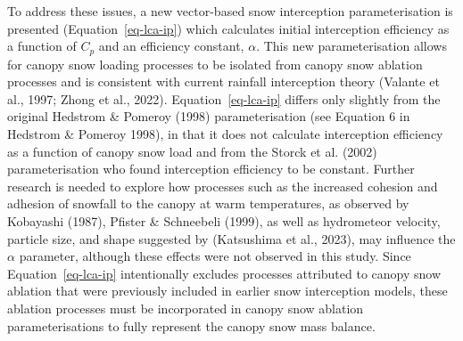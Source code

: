 \documentclass[
  letterpaper,
  DIV=11,
  numbers=noendperiod]{scrartcl}
\begin{document}
To address these issues, a new vector-based snow interception
parameterisation is presented (Equation~\ref{eq-lca-ip}) which
calculates initial interception efficiency as a function of \(C_p\) and
an efficiency constant, \(\alpha\). This new parameterisation allows for
canopy snow loading processes to be isolated from canopy snow ablation
processes and is consistent with current rainfall interception theory
(Valante et al., 1997; Zhong et al., 2022). Equation~\ref{eq-lca-ip}
differs only slightly from the original Hedstrom \& Pomeroy (1998)
parameterisation (see Equation 6 in Hedstrom \& Pomeroy 1998), in that
it does not calculate interception efficiency as a function of canopy
snow load and from the Storck et al. (2002) parameterisation who found
interception efficiency to be constant. Further research is needed to
explore how processes such as the increased cohesion and adhesion of
snowfall to the canopy at warm temperatures, as observed by Kobayashi
(1987), Pfister \& Schneebeli (1999), as well as hydrometeor velocity,
particle size, and shape suggested by (Katsushima et al., 2023), may
influence the \(\alpha\) parameter, although these effects were not
observed in this study. Since Equation~\ref{eq-lca-ip} intentionally
excludes processes attributed to canopy snow ablation that were
previously included in earlier snow interception models, these ablation
processes must be incorporated in canopy snow ablation parameterisations
to fully represent the canopy snow mass balance.
\end{document}
